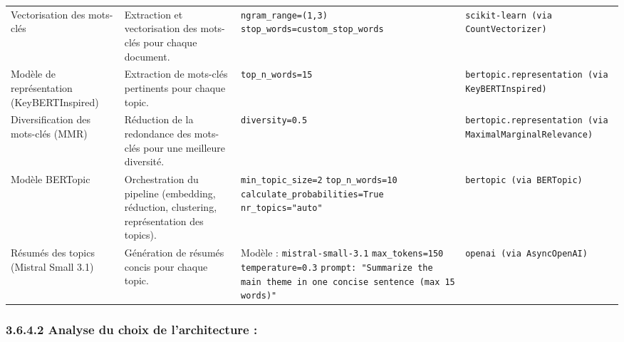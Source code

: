 \documentclass[mstat,12pt]{unswthesis}
\begin{document}
\begin{scriptsize}
\begin{longtable}{@{}p{3.7cm} p{3.9cm} p{5.5cm} p{3.8cm}@{}}
Vectorisation des mots-clés & Extraction et vectorisation des mots-clés pour chaque document. &
\texttt{ngram\_range=(1,3)} \newline
\texttt{stop\_words=custom\_stop\_words} &
\texttt{scikit-learn (via CountVectorizer)} \\

Modèle de représentation (KeyBERTInspired) & Extraction de mots-clés pertinents pour chaque topic. &
\texttt{top\_n\_words=15} &
\texttt{bertopic.representation (via KeyBERTInspired)} \\

Diversification des mots-clés (MMR) & Réduction de la redondance des mots-clés pour une meilleure diversité. &
\texttt{diversity=0.5} &
\texttt{bertopic.representation (via MaximalMarginalRelevance)} \\

Modèle BERTopic & Orchestration du pipeline (embedding, réduction, clustering, représentation des topics). &
\texttt{min\_topic\_size=2} \newline
\texttt{top\_n\_words=10} \newline
\texttt{calculate\_probabilities=True} \newline
\texttt{nr\_topics="auto"} &
\texttt{bertopic (via BERTopic)} \\

Résumés des topics (Mistral Small 3.1) & Génération de résumés concis pour chaque topic. &
Modèle : \texttt{mistral-small-3.1} \newline
\texttt{max\_tokens=150} \newline
\texttt{temperature=0.3} \newline
\texttt{prompt: "Summarize the main theme in one concise sentence (max 15 words)"} &
\texttt{openai (via AsyncOpenAI)} \\

\end{longtable}
\end{scriptsize}


\bigskip

\subsubsection{3.6.4.2   Analyse du choix de l’architecture : }

\bigskip
\end{document}
